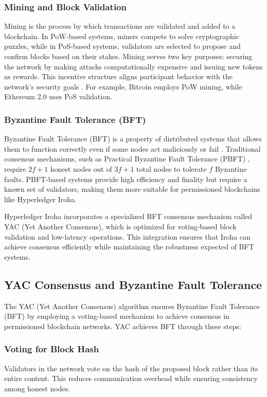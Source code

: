 \documentclass{article}
\begin{document}
\subsubsection{Mining and Block Validation}
Mining is the process by which transactions are validated and added to a blockchain. In PoW-based systems, miners compete to solve cryptographic puzzles, while in PoS-based systems, validators are selected to propose and confirm blocks based on their stakes. Mining serves two key purposes: securing the network by making attacks computationally expensive and issuing new tokens as rewards. This incentive structure aligns participant behavior with the network’s security goals \cite{bonneau2015sok}. For example, Bitcoin employs PoW mining, while Ethereum 2.0 uses PoS validation.

\subsubsection{Byzantine Fault Tolerance (BFT)}

Byzantine Fault Tolerance (BFT) is a property of distributed systems that allows them to function correctly even if some nodes act maliciously or fail \cite{lamport1982byzantine}. Traditional consensus mechanisms, such as Practical Byzantine Fault Tolerance (PBFT) \cite{castro1999practical}, require \(2f+1\) honest nodes out of \(3f+1\) total nodes to tolerate \(f\) Byzantine faults. PBFT-based systems provide high efficiency and finality but require a known set of validators, making them more suitable for permissioned blockchains like Hyperledger Iroha.

Hyperledger Iroha incorporates a specialized BFT consensus mechanism called YAC (Yet Another Consensus), which is optimized for voting-based block validation and low-latency operations. This integration ensures that Iroha can achieve consensus efficiently while maintaining the robustness expected of BFT systems.

\subsection{YAC Consensus and Byzantine Fault Tolerance}
The YAC (Yet Another Consensus) algorithm ensures Byzantine Fault Tolerance (BFT) \cite{muratov_yac_2018} by employing a voting-based mechanism to achieve consensus in permissioned blockchain networks. YAC achieves BFT through these steps:

\subsubsection{Voting for Block Hash}
Validators in the network vote on the hash of the proposed block rather than its entire content. This reduces communication overhead while ensuring consistency among honest nodes.
\end{document}
